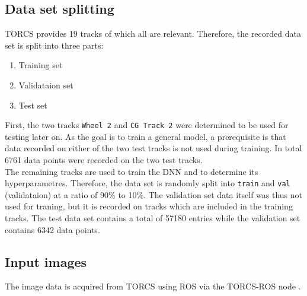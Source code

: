\documentclass[10pt,a4paper,twoside,journal]{IEEEtran}
\begin{document}

\subsection{Data set splitting}
\label{ssc:data-set-split}
TORCS provides 19 tracks of which all are relevant. Therefore, the recorded data set is split into three parts: 
\begin{enumerate}
	\item Training set
	\item Validataion set
	\item Test set
\end{enumerate}
First, the two tracks \texttt{Wheel 2} and \texttt{CG Track 2} were determined to be used for testing later on. As the goal is to train a general model, a prerequisite is that data recorded on either of the two test tracks is not used during training. In total 6761 data points were recorded on the two test tracks. \\
The remaining tracks are used to train the DNN and to determine its hyperparametres. Therefore, the data set is randomly split into \texttt{train} and \texttt{val} (validataion) at a ratio of 90\% to 10\%. The validation set data itself was thus not used for traning, but it is recorded on tracks which are included in the training tracks. The test data set contains a total of 57180 entries while the validation set contains 6342 data points.

\subsection{Input images}
The image data is acquired from TORCS \cite{TORCS} using ROS via the TORCS-ROS node \cite{mirus_torcs-ros_2017}. 
\end{document}
